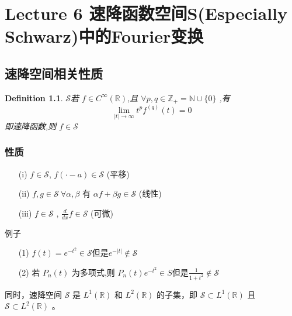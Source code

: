 \documentclass[linespread=1.5,openany]{book}%
\theoremstyle{plain}
\newtheorem{definition}{Definition}
\begin{document}
		\part{Lecture 6 速降函数空间S(Especially Schwarz)中的Fourier变换}
		{
			\chapter{速降空间相关性质}
			\begin{definition}
				\(\mathcal{S}\)若 \(f \in C^{\infty}(\mathbb{R})\),且 \(\forall p, q \in \mathbb{Z}_{+}=\mathbb{N}\cup\{0\}\) ,有 \[\lim_{|t|\to\infty}t^{p}f^{(q)}(t) = 0\] 即速降函数,则 \(f \in \mathcal{S}\) 
			\end{definition}
			\section{性质}
			\begin{itemize}
				\item[(i)] \(f \in \mathcal{S}\), \(f(\cdot - a) \in \mathcal{S}\) (平移)
				\item[(ii)] \(f, g \in \mathcal{S} \ \forall \alpha, \beta\) 有 \(\alpha f + \beta g \in \mathcal{S}\) (线性)
				\item[(iii)]\(f \in \mathcal{S}\) , \(\frac{d}{dx}f \in \mathcal{S}\) (可微)
			\end{itemize}
			例子
			\begin{itemize}
				\item[(1)]\(f(t)=e^{-t^{2}} \in \mathcal{S} \)但是\(e^{-|t|} \notin \mathcal{S}\)\\
				\item[(2)]若 \(P_{n}(t)\) 为多项式,则 \(P_{n}(t)e^{-t^{2}} \in S\)但是\(\frac{1}{1 + t^{2}} \notin \mathcal{S}\)
			\end{itemize}
			同时，速降空间 \(\mathcal{S}\) 是 \(L^{1}(\mathbb{R})\) 和 \(L^{2}(\mathbb{R})\) 的子集，即 \(\mathcal{S} \subset L^{1}(\mathbb{R})\) 且 \(\mathcal{S} \subset L^{2}(\mathbb{R})\) 。
			
}
\end{document}
